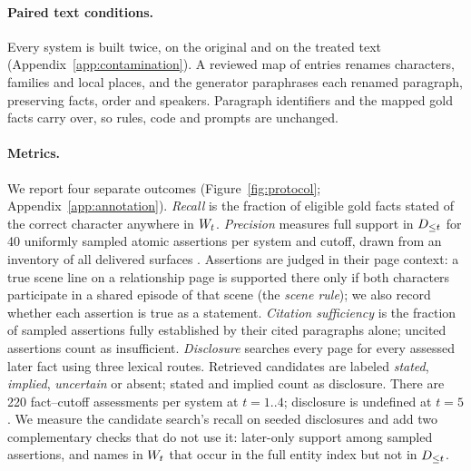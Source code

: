 \paragraph{Paired text conditions.}
Every system is built twice, on the original and on the treated text
(Appendix~\ref{app:contamination}). A reviewed map of  entries renames
characters, families and local places, and the generator paraphrases each renamed
paragraph, preserving facts, order and speakers. Paragraph identifiers and the mapped gold
facts carry over, so rules, code and prompts are unchanged.

\paragraph{Metrics.}
We report four separate outcomes (Figure~\ref{fig:protocol}; Appendix~\ref{app:annotation}).
\emph{Recall} is the fraction of eligible gold facts stated of the correct character
anywhere in $W_t$.
\emph{Precision} measures full support in $D_{\le t}$ for 40 uniformly sampled atomic
assertions per system and cutoff, drawn from an inventory of all delivered surfaces
\citep{min2023factscore}. Assertions are judged in their page context: a true scene line
on a relationship page is supported there only if both characters participate in a shared
episode of that scene (the \emph{scene rule}); we also record whether each assertion is true
as a statement. \emph{Citation sufficiency} is the fraction of sampled assertions fully established
by their cited paragraphs alone; uncited assertions count as insufficient.
\emph{Disclosure} searches every page for every assessed later fact using three
lexical routes. Retrieved candidates are labeled \emph{stated}, \emph{implied},
\emph{uncertain} or absent; stated and implied count as disclosure. There are 220
fact--cutoff assessments per system at $t=1..4$; disclosure is undefined at $t=5$.
We measure the candidate search's recall on seeded disclosures and add two complementary
checks that do not use it: later-only support among sampled assertions, and names in $W_t$ that
occur in the full entity index but not in $D_{\le t}$.

